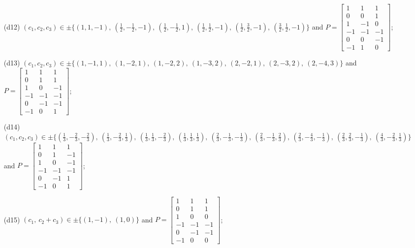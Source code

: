 \begin{enumerate}
\item[(d12)] $(c_1,c_2,c_3)\in \pm\{(1,1,-1),\allowbreak\ (\tfrac{1}{2},-\tfrac{1}{2},-1),\allowbreak\ (\tfrac{1}{2},-\tfrac{1}{2},1),\allowbreak\ (\tfrac{1}{2},\tfrac{1}{2},-1),\allowbreak\ (\tfrac{1}{2},\tfrac{3}{2},-1),\allowbreak\ (\tfrac{3}{2},\tfrac{1}{2},-1)\}$ and $P=\begin{bmatrix}1&1&1\\0&0&1\\1&-1&0\\-1&-1&-1\\0&0&-1\\-1&1&0\end{bmatrix}$;
\item[(d13)] $(c_1,c_2,c_3)\in \pm\{(1,-1,1),\allowbreak\ (1,-2,1),\allowbreak\ (1,-2,2),\allowbreak\ (1,-3,2),\allowbreak\ (2,-2,1),\allowbreak\ (2,-3,2),\allowbreak\ (2,-4,3)\}$ and $P=\begin{bmatrix}1&1&1\\0&1&1\\1&0&-1\\-1&-1&-1\\0&-1&-1\\-1&0&1\end{bmatrix}$;
\item[(d14)] $(c_1,c_2,c_3)\in \pm\{(\tfrac{1}{3},-\tfrac{2}{3},-\tfrac{2}{3}),\allowbreak\ (\tfrac{1}{3},-\tfrac{2}{3},\tfrac{1}{3}),\allowbreak\ (\tfrac{1}{3},\tfrac{1}{3},-\tfrac{2}{3}),\allowbreak\ (\tfrac{1}{3},\tfrac{1}{3},\tfrac{1}{3}),\allowbreak\ (\tfrac{2}{3},-\tfrac{1}{3},-\tfrac{1}{3}),\allowbreak\ (\tfrac{2}{3},-\tfrac{1}{3},\tfrac{2}{3}),\allowbreak\ (\tfrac{2}{3},-\tfrac{4}{3},-\tfrac{1}{3}),\allowbreak\ (\tfrac{2}{3},\tfrac{2}{3},-\tfrac{1}{3}),\allowbreak\ (\tfrac{4}{3},-\tfrac{2}{3},\tfrac{1}{3})\}$ and $P=\begin{bmatrix}1&1&1\\0&1&-1\\1&0&-1\\-1&-1&-1\\0&-1&1\\-1&0&1\end{bmatrix}$;
\item[(d15)] $(c_1,\ c_2+c_3)\in \pm\{(1,-1),\allowbreak\ (1,0)\}$ and $P=\begin{bmatrix}1&1&1\\0&1&1\\1&0&0\\-1&-1&-1\\0&-1&-1\\-1&0&0\end{bmatrix}$;

\end{enumerate}

